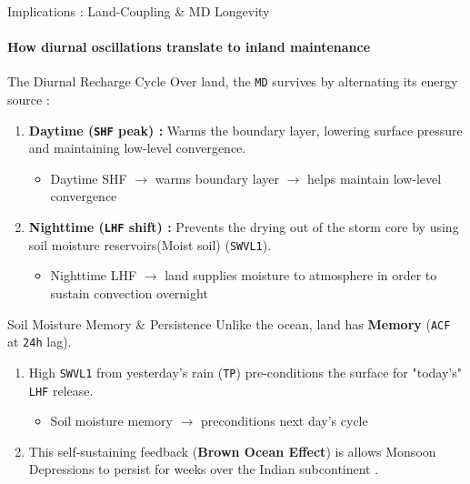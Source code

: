 \documentclass[8pt, aspectratio=169]{beamer}
\begin{document}
\begin{frame}{Implications : Land-Coupling \& MD Longevity}
    \framesubtitle{How diurnal oscillations translate to inland maintenance}

    \footnotesize
    \begin{block}{The Diurnal Recharge Cycle}
        Over land, the \texttt{MD} survives by alternating its energy source :
        \begin{enumerate}
            \footnotesize
            \item \textbf{Daytime (\texttt{SHF} peak) :} Warms the boundary layer, lowering surface pressure and maintaining low-level convergence.
                \footnotesize
                \begin{itemize}
                    \tiny
                    \item Daytime SHF $\rightarrow$ warms boundary layer $\rightarrow$ helps maintain low-level convergence
                \end{itemize}
            \footnotesize
            \item \textbf{Nighttime (\texttt{LHF} shift) :} Prevents the drying out of the storm core by using soil moisture reservoirs(Moist soil) (\texttt{SWVL1}).
                \begin{itemize}
                    \tiny
                    \item Nighttime LHF $\rightarrow$ land supplies moisture to atmosphere in order to sustain convection overnight
                \end{itemize}
        \end{enumerate}
    \end{block}

    \footnotesize
    \begin{block}{Soil Moisture Memory \& Persistence}
        Unlike the ocean, land has \textbf{Memory} (\texttt{ACF} at \texttt{24h} lag).
        \begin{enumerate}
            \item High \texttt{SWVL1} from yesterday's rain (\texttt{TP}) pre-conditions the surface for "today's" \texttt{LHF} release.
                \begin{itemize}
                    \tiny
                    \item Soil moisture memory $\rightarrow$ preconditions next day's cycle
                \end{itemize}
            \item This self-sustaining feedback (\textbf{Brown Ocean Effect}) is allows Monsoon Depressions to persist for weeks over the Indian subcontinent \cite{kishtawal2013tropical}.
        \end{enumerate}
    \end{block}


\end{frame}
\end{document}
